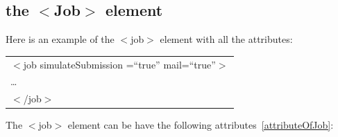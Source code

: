\subsection{the $<$Job$>$ element}
Here is an example of the $<$job$>$ element with all the attributes:
\begin{center}
  \begin{tabular}{l}
    $<$job simulateSubmission =\textquotedblleft{}true\textquotedblright{} mail=\textquotedblleft{}true\textquotedblright{}$>$ \\
    \dots \\
    $<$/job$>$
  \end{tabular}
\end{center}
The $<$job$>$ element can be have the following attributes~\ref{attributeOfJob}:\\
